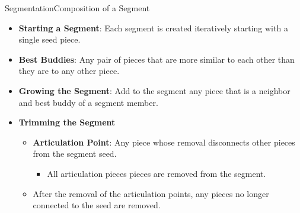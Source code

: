 \documentclass[handout,10pt]{beamer}  %
\begin{document}
\begin{frame}{Segmentation}{Composition of a Segment}
  \begin{itemize}
    \setlength\itemsep{0.8em}
    \item \textbf{Starting a Segment}: Each segment is created iteratively starting with a single seed piece.
    \vfill
    \item \textbf{Best Buddies}: Any pair of pieces that are more similar to each other than they are to any other piece.
    \vfill 
    \item \textbf{Growing the Segment}: Add to the segment any piece that is a neighbor and best buddy of a segment member.
    \vfill
    \item \textbf{Trimming the Segment}
    \begin{itemize}
    \setlength\itemsep{0.8em}
	    \item \textbf{Articulation Point}: Any piece whose removal disconnects other pieces from the segment seed.
	    \vspace{0.4em}
	    \begin{itemize}
	      \item All articulation pieces pieces are removed from the segment.  
	    \end{itemize}
	    \item After the removal of the articulation points, any pieces no longer connected to the seed are removed.
    \end{itemize}
  \end{itemize}
\end{frame}
\end{document}
